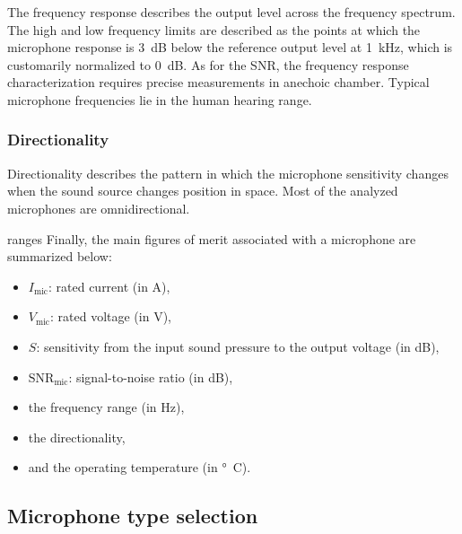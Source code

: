 \documentclass{EPL-master-thesis-covers-EN}
\newcommand{\te}[1]{\textrm{#1}}
\begin{document}
The frequency response describes the output level across the frequency spectrum. The high and low frequency limits are described as the points at which the microphone response is \SI{3}{dB} below the reference output level at \SI{1}{kHz}, which is customarily normalized to \SI{0}{dB}. As for the SNR, the frequency response characterization requires precise measurements in anechoic chamber. Typical microphone frequencies lie in the human hearing range.

\subsubsection*{Directionality}

Directionality describes the pattern in which the microphone sensitivity changes when the sound source changes position in space. Most of the analyzed microphones are omnidirectional.

ranges
Finally, the main figures of merit associated with a microphone are summarized below:

\begin{itemize}
 \item $I_{\te{mic}}$: rated current (in A),
 \item $V_{\te{mic}}$: rated voltage (in V),
 \item $S$: sensitivity from the input sound pressure to the output voltage (in dB),
 \item $\te{SNR}_{\te{mic}}$: signal-to-noise ratio (in dB),
 \item the frequency range (in Hz),
 \item the directionality,
 \item and the operating temperature (in \si{\degree C}).
\end{itemize}


\subsection*{Microphone type selection}
\end{document}
